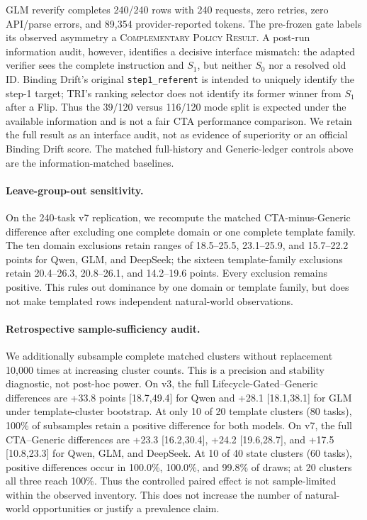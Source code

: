 \documentclass[10pt]{article}
\begin{document}
GLM reverify completes 240/240 rows with 240 requests, zero retries, zero API/parse errors, and
89,354 provider-reported tokens. The pre-frozen gate labels its observed asymmetry a
\textsc{Complementary Policy Result}. A post-run information audit, however, identifies a decisive
interface mismatch: the adapted verifier sees the complete instruction and $S_1$, but neither
$S_0$ nor a resolved old ID. Binding Drift's original \texttt{step1\_referent} is intended to
uniquely identify the step-1 target; TRI's ranking selector does not identify its former winner
from $S_1$ after a Flip. Thus the 39/120 versus 116/120 mode split is expected under the available
information and is not a fair CTA performance comparison. We retain the full result as an
interface audit, not as evidence of superiority or an official Binding Drift score. The matched
full-history and Generic-ledger controls above are the information-matched baselines.

\paragraph{Leave-group-out sensitivity.}
On the 240-task v7 replication, we recompute the matched CTA-minus-Generic difference after
excluding one complete domain or one complete template family. The ten domain exclusions retain
ranges of 18.5--25.5, 23.1--25.9, and 15.7--22.2 points for Qwen, GLM, and DeepSeek; the sixteen
template-family exclusions retain 20.4--26.3, 20.8--26.1, and 14.2--19.6 points. Every exclusion
remains positive. This rules out dominance by one domain or template family, but does not make
templated rows independent natural-world observations.

\paragraph{Retrospective sample-sufficiency audit.}
We additionally subsample complete matched clusters without replacement 10,000 times at
increasing cluster counts. This is a precision and stability diagnostic, not post-hoc power.
On v3, the full Lifecycle-Gated--Generic differences are +33.8 points [18.7,49.4] for Qwen
and +28.1 [18.1,38.1] for GLM under template-cluster bootstrap. At only 10 of 20 template
clusters (80 tasks), 100\% of subsamples retain a positive difference for both models. On v7,
the full CTA--Generic differences are +23.3 [16.2,30.4], +24.2 [19.6,28.7], and +17.5
[10.8,23.3] for Qwen, GLM, and DeepSeek. At 10 of 40 state clusters (60 tasks), positive
differences occur in 100.0\%, 100.0\%, and 99.8\% of draws; at 20 clusters all three reach
100\%. Thus the controlled paired effect is not sample-limited within the observed inventory.
This does not increase the number of natural-world opportunities or justify a prevalence claim.
\end{document}
